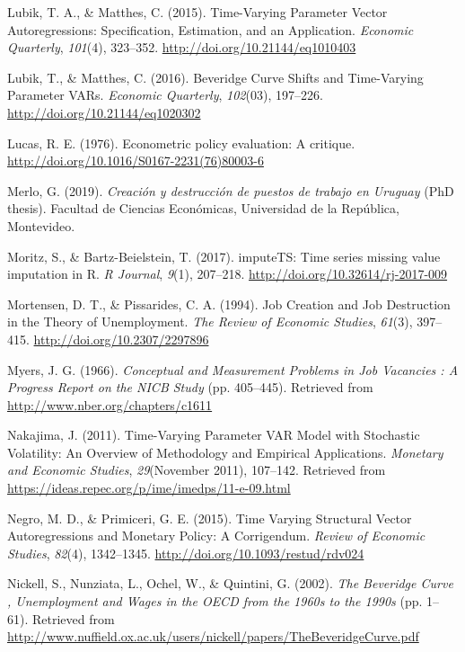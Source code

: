 \documentclass[12pt,oneside]{reedthesis}
\begin{document}
\leavevmode\hypertarget{ref-Lubik2016b}{}%
Lubik, T. A., \& Matthes, C. (2015). Time-Varying Parameter Vector Autoregressions: Specification, Estimation, and an Application. \emph{Economic Quarterly}, \emph{101}(4), 323--352. \url{http://doi.org/10.21144/eq1010403}

\leavevmode\hypertarget{ref-Lubik2016}{}%
Lubik, T., \& Matthes, C. (2016). Beveridge Curve Shifts and Time-Varying Parameter VARs. \emph{Economic Quarterly}, \emph{102}(03), 197--226. \url{http://doi.org/10.21144/eq1020302}

\leavevmode\hypertarget{ref-Lucas1976}{}%
Lucas, R. E. (1976). Econometric policy evaluation: A critique. \url{http://doi.org/10.1016/S0167-2231(76)80003-6}

\leavevmode\hypertarget{ref-Merlo2019}{}%
Merlo, G. (2019). \emph{Creación y destrucción de puestos de trabajo en Uruguay} (PhD thesis). Facultad de Ciencias Económicas, Universidad de la República, Montevideo.

\leavevmode\hypertarget{ref-Moritz2017}{}%
Moritz, S., \& Bartz-Beielstein, T. (2017). imputeTS: Time series missing value imputation in R. \emph{R Journal}, \emph{9}(1), 207--218. \url{http://doi.org/10.32614/rj-2017-009}

\leavevmode\hypertarget{ref-Mortensen1994}{}%
Mortensen, D. T., \& Pissarides, C. A. (1994). Job Creation and Job Destruction in the Theory of Unemployment. \emph{The Review of Economic Studies}, \emph{61}(3), 397--415. \url{http://doi.org/10.2307/2297896}

\leavevmode\hypertarget{ref-Myers1966}{}%
Myers, J. G. (1966). \emph{Conceptual and Measurement Problems in Job Vacancies : A Progress Report on the NICB Study} (pp. 405--445). Retrieved from \url{http://www.nber.org/chapters/c1611}

\leavevmode\hypertarget{ref-Nakajima2011}{}%
Nakajima, J. (2011). Time-Varying Parameter VAR Model with Stochastic Volatility: An Overview of Methodology and Empirical Applications. \emph{Monetary and Economic Studies}, \emph{29}(November 2011), 107--142. Retrieved from \url{https://ideas.repec.org/p/ime/imedps/11-e-09.html}

\leavevmode\hypertarget{ref-Primiceri2015}{}%
Negro, M. D., \& Primiceri, G. E. (2015). Time Varying Structural Vector Autoregressions and Monetary Policy: A Corrigendum. \emph{Review of Economic Studies}, \emph{82}(4), 1342--1345. \url{http://doi.org/10.1093/restud/rdv024}

\leavevmode\hypertarget{ref-Nickell2002}{}%
Nickell, S., Nunziata, L., Ochel, W., \& Quintini, G. (2002). \emph{The Beveridge Curve , Unemployment and Wages in the OECD from the 1960s to the 1990s} (pp. 1--61). Retrieved from \url{http://www.nuffield.ox.ac.uk/users/nickell/papers/TheBeveridgeCurve.pdf}
\end{document}
